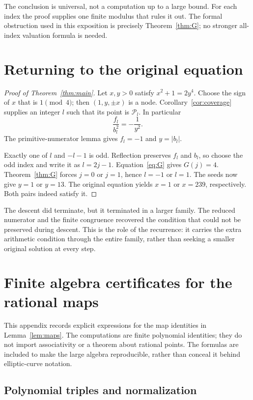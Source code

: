 \documentclass[11pt,a4paper]{article}
\theoremstyle{definition}
\newcommand{\pp}{\mathcal P}
\begin{document}
The conclusion is universal, not a computation up to a large bound.
For each index the proof supplies one finite modulus that rules it
out. The formal obstruction used in this exposition is precisely
Theorem~\ref{thm:G}; no stronger all-index valuation formula is needed.

\section{Returning to the original equation}\label{sec:finish}

\begin{proof}[Proof of Theorem~\ref{thm:main}]
Let \(x,y>0\) satisfy \(x^2+1=2y^4\). Choose the sign of \(x\)
that is \(1\pmod4\); then \((1,y,\pm x)\) is a node.
Corollary~\ref{cor:coverage} supplies an integer \(l\) such that its
point is \(\pp_l\). In particular
\[
 \frac{f_l}{b_l^2}=-\frac1{y^2}.
\]
The primitive-numerator lemma gives \(f_l=-1\) and \(y=|b_l|\).

Exactly one of \(l\) and \(-l-1\) is odd. Reflection preserves
\(f_l\) and \(b_l\), so choose the odd index and write it as
\(l=2j-1\). Equation~\eqref{eq:G} gives \(G(j)=4\).
Theorem~\ref{thm:G} forces \(j=0\) or \(j=1\), hence
\(l=-1\) or \(l=1\). The seeds now give \(y=1\) or \(y=13\).
The original equation yields \(x=1\) or \(x=239\), respectively.
Both pairs indeed satisfy it.
\end{proof}

The descent did terminate, but it terminated in a larger family.
The reduced numerator and the finite congruence recovered the condition
that could not be preserved during descent. This is the role of the
recurrence: it carries the extra arithmetic condition through the
entire family, rather than seeking a smaller original solution at
every step.

\appendix
\section{Finite algebra certificates for the rational maps}\label{app:maps}

This appendix records explicit expressions for the map identities in
Lemma~\ref{lem:maps}. The computations are finite polynomial
identities; they do not import associativity or a theorem about
rational points. The formulas are included to make the large algebra
reproducible, rather than conceal it behind elliptic-curve notation.

\subsection{Polynomial triples and normalization}
\end{document}
